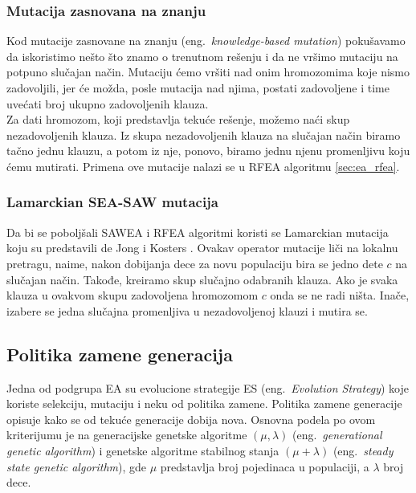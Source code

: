 \documentclass[a4paper]{article}
\begin{document}
\subsubsection{Mutacija zasnovana na znanju}
\label{sec:ea_mutacija_znanje}
Kod mutacije zasnovane na znanju (eng.~{\em knowledge-based mutation}) \cite{ea_with_table}
pokušavamo da iskoristimo nešto što znamo o trenutnom rešenju
i da ne vršimo mutaciju na potpuno slučajan način.
Mutaciju ćemo vršiti nad onim hromozomima koje nismo zadovoljili, 
jer će možda, posle mutacija nad njima, postati zadovoljene i time uvećati broj ukupno
zadovoljenih klauza.\\

Za dati hromozom, koji predstavlja
tekuće rešenje, možemo naći skup nezadovoljenih klauza. 
Iz skupa nezadovoljenih klauza na slučajan način biramo tačno jednu klauzu, 
a potom iz nje, ponovo, biramo jednu njenu promenljivu koju ćemu mutirati. 
Primena ove mutacije nalazi se u RFEA algoritmu \ref{sec:ea_rfea}.

\subsubsection{Lamarckian SEA-SAW mutacija}
\label{sec:ea_lamarckian}
Da bi se poboljšali SAWEA i RFEA algoritmi koristi se Lamarckian mutacija koju su predstavili 
de Jong i Kosters \cite{ea_without_table, ea_with_table}. 
Ovakav operator mutacije liči na lokalnu pretragu, naime, 
nakon dobijanja dece za novu populaciju bira se jedno dete $c$ na slučajan način.
Takođe, kreiramo skup slučajno odabranih klauza. 
Ako je svaka klauza u ovakvom skupu zadovoljena hromozomom $c$ onda se ne radi ništa. 
Inače, izabere se jedna slučajna promenljiva u nezadovoljenoj klauzi i mutira se.


\subsection{Politika zamene generacija}
\label{sec:ea_zamena}
Jedna od podgrupa EA su evolucione strategije ES (eng.~{\em Evolution Strategy}) koje
koriste selekciju, mutaciju i neku od politika zamene.
Politika zamene generacije \cite{vi_Janicic, ea_without_table} opisuje kako se od tekuće
generacije dobija nova. Osnovna podela po ovom kriterijumu je na generacijske genetske
algoritme $(\mu, \lambda)$ (eng.~{\em generational genetic algorithm}) i genetske algoritme
stabilnog stanja $(\mu + \lambda)$ (eng.~{\em steady state genetic algorithm}), gde $\mu$
predstavlja broj pojedinaca u populaciji, a $\lambda$ broj dece. \\
 
\end{document}
